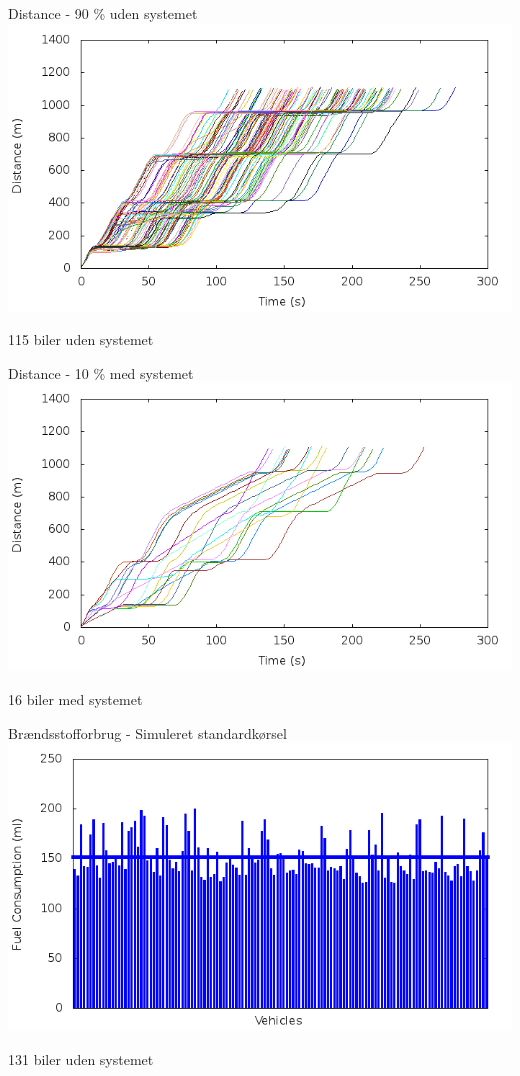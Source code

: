 \begin{frame}{Distance - 90 \% uden systemet}
\includegraphics[width=1\textwidth]{../Article/images/tp0/distanceUncontrolled10.png}

115 biler uden systemet
\end{frame}

\begin{frame}{Distance - 10 \% med systemet}
\includegraphics[width=1\textwidth]{../Article/images/tp0/distanceControlled10.png}

16 biler med systemet
\end{frame}

\begin{frame}{Brændsstofforbrug - Simuleret standardkørsel}
\includegraphics[width=1\textwidth]{../Article/images/tp0/fuelRouteUncontrolled0.png}

131 biler uden systemet
\end{frame}


